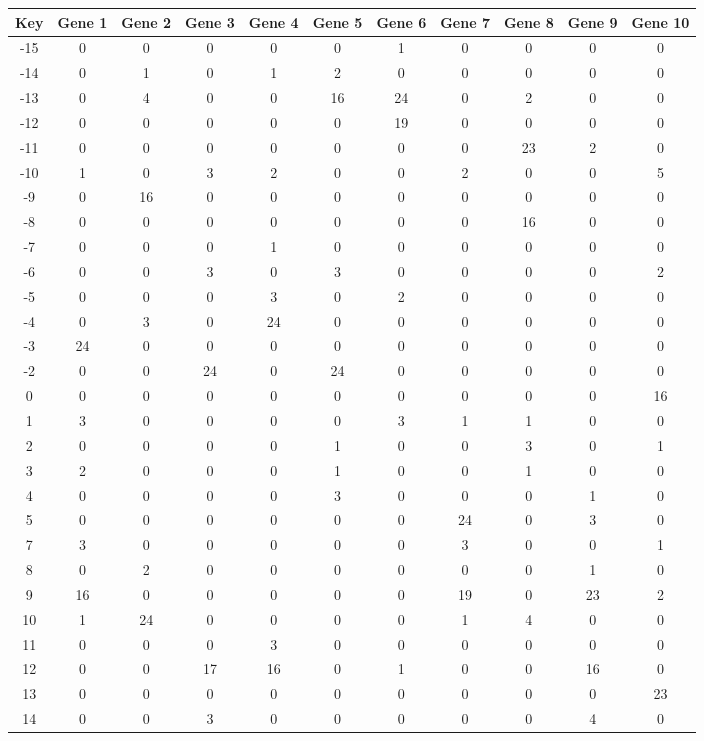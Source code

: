 \begin{tabular}{|c|c|c|c|c|c|c|c|c|c|c|}
\hline
Key & Gene 1 & Gene 2 & Gene 3 & Gene 4 & Gene 5 & Gene 6 & Gene 7 & Gene 8 & Gene 9 & Gene 10 \\
\hline
-15 & 0 & 0 & 0 & 0 & 0 & 1 & 0 & 0 & 0 & 0 \\
-14 & 0 & 1 & 0 & 1 & 2 & 0 & 0 & 0 & 0 & 0 \\
-13 & 0 & 4 & 0 & 0 & 16 & 24 & 0 & 2 & 0 & 0 \\
-12 & 0 & 0 & 0 & 0 & 0 & 19 & 0 & 0 & 0 & 0 \\
-11 & 0 & 0 & 0 & 0 & 0 & 0 & 0 & 23 & 2 & 0 \\
-10 & 1 & 0 & 3 & 2 & 0 & 0 & 2 & 0 & 0 & 5 \\
-9 & 0 & 16 & 0 & 0 & 0 & 0 & 0 & 0 & 0 & 0 \\
-8 & 0 & 0 & 0 & 0 & 0 & 0 & 0 & 16 & 0 & 0 \\
-7 & 0 & 0 & 0 & 1 & 0 & 0 & 0 & 0 & 0 & 0 \\
-6 & 0 & 0 & 3 & 0 & 3 & 0 & 0 & 0 & 0 & 2 \\
-5 & 0 & 0 & 0 & 3 & 0 & 2 & 0 & 0 & 0 & 0 \\
-4 & 0 & 3 & 0 & 24 & 0 & 0 & 0 & 0 & 0 & 0 \\
-3 & 24 & 0 & 0 & 0 & 0 & 0 & 0 & 0 & 0 & 0 \\
-2 & 0 & 0 & 24 & 0 & 24 & 0 & 0 & 0 & 0 & 0 \\
0 & 0 & 0 & 0 & 0 & 0 & 0 & 0 & 0 & 0 & 16 \\
1 & 3 & 0 & 0 & 0 & 0 & 3 & 1 & 1 & 0 & 0 \\
2 & 0 & 0 & 0 & 0 & 1 & 0 & 0 & 3 & 0 & 1 \\
3 & 2 & 0 & 0 & 0 & 1 & 0 & 0 & 1 & 0 & 0 \\
4 & 0 & 0 & 0 & 0 & 3 & 0 & 0 & 0 & 1 & 0 \\
5 & 0 & 0 & 0 & 0 & 0 & 0 & 24 & 0 & 3 & 0 \\
7 & 3 & 0 & 0 & 0 & 0 & 0 & 3 & 0 & 0 & 1 \\
8 & 0 & 2 & 0 & 0 & 0 & 0 & 0 & 0 & 1 & 0 \\
9 & 16 & 0 & 0 & 0 & 0 & 0 & 19 & 0 & 23 & 2 \\
10 & 1 & 24 & 0 & 0 & 0 & 0 & 1 & 4 & 0 & 0 \\
11 & 0 & 0 & 0 & 3 & 0 & 0 & 0 & 0 & 0 & 0 \\
12 & 0 & 0 & 17 & 16 & 0 & 1 & 0 & 0 & 16 & 0 \\
13 & 0 & 0 & 0 & 0 & 0 & 0 & 0 & 0 & 0 & 23 \\
14 & 0 & 0 & 3 & 0 & 0 & 0 & 0 & 0 & 4 & 0 \\
\hline
\end{tabular}